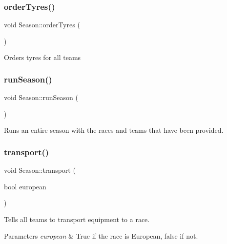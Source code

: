 \subsubsection{\texorpdfstring{order\+Tyres()}{orderTyres()}}
{\footnotesize\ttfamily void Season\+::order\+Tyres (\begin{DoxyParamCaption}{ }\end{DoxyParamCaption})\hspace{0.3cm}{\ttfamily [private]}}

Orders tyres for all teams \mbox{\label{classSeason_ac87bc08315fcfb5a5921e476ff608934}} 
\subsubsection{\texorpdfstring{run\+Season()}{runSeason()}}
{\footnotesize\ttfamily void Season\+::run\+Season (\begin{DoxyParamCaption}{ }\end{DoxyParamCaption})}

Runs an entire season with the races and teams that have been provided. \mbox{\label{classSeason_a28bc89521eec63fe56039c9d1e50c548}} 
\subsubsection{\texorpdfstring{transport()}{transport()}}
{\footnotesize\ttfamily void Season\+::transport (\begin{DoxyParamCaption}\item[{bool}]{european }\end{DoxyParamCaption})\hspace{0.3cm}{\ttfamily [private]}}

Tells all teams to transport equipment to a race. 
\begin{DoxyParams}{Parameters}
{\em european} & True if the race is European, false if not. \\
\hline
\end{DoxyParams}
\mbox{\label{classSeason_ac03a6b5518cfac9b2c6fce755c8f9821}} 

